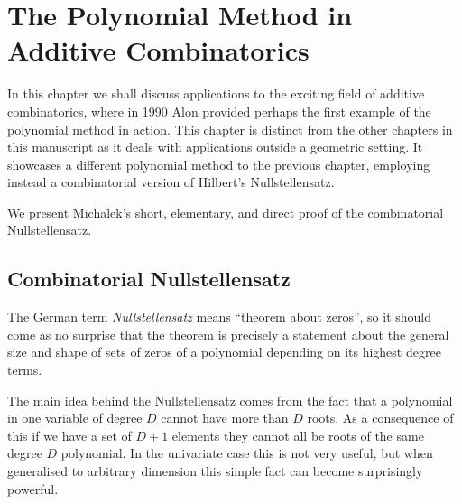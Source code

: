 \chapter{The Polynomial Method in Additive Combinatorics \label{chap:alon}}
In this chapter we shall discuss applications to the exciting field of additive combinatorics, where in 1990 Alon provided perhaps
the first example of the polynomial method in action.\cite{alon1999combinatorial} This chapter is distinct from the other chapters in this manuscript as it deals with applications outside a geometric setting. It showcases a different polynomial method to the previous chapter, employing instead a combinatorial version of Hilbert's Nullstellensatz.

We present Michalek's short, elementary, and direct proof of the combinatorial Nullstellensatz.\cite{michalek2010}
\section{Combinatorial Nullstellensatz}
The German term \textit{Nullstellensatz} means ``theorem about zeros'', so it should come as no surprise that the theorem is precisely a statement about the general size and shape of sets of zeros of a polynomial depending on its highest degree terms. 

The main idea behind the Nullstellensatz comes from the fact that a polynomial in one variable of degree $D$ cannot have more than $D$ roots. As a consequence of this if we have a set of $D+1$ elements they cannot all be roots of the same degree $D$ polynomial. In the univariate case this is not very useful, but when generalised to arbitrary dimension this simple fact can become surprisingly powerful. 

